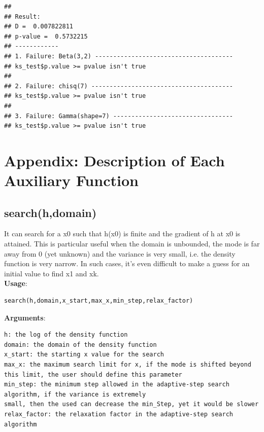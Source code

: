 \documentclass{llncs}\usepackage[]{graphicx}\usepackage[]{color}
\makeatletter
\newenvironment{kframe}{%
 \def\at@end@of@kframe{}%
 \ifinner\ifhmode%
  \def\at@end@of@kframe{\end{minipage}}%
  \begin{minipage}{\columnwidth}%
 \fi\fi%
 \def\FrameCommand##1{\hskip\@totalleftmargin \hskip-\fboxsep
 \colorbox{shadecolor}{##1}\hskip-\fboxsep
     \hskip-\linewidth \hskip-\@totalleftmargin \hskip\columnwidth}%
 \MakeFramed {\advance\hsize-\width
   \@totalleftmargin\z@ \linewidth\hsize
   \@setminipage}}%
 {\par\unskip\endMakeFramed%
 \at@end@of@kframe}
\newenvironment{knitrout}{}{} %
\makeatother
\begin{document}
\begin{knitrout}
\begin{kframe}\begin{lstlisting}[basicstyle=\ttfamily,breaklines=true]
## 
## Result:
## D =  0.007822811 
## p-value =  0.5732215 
## ------------
## 1. Failure: Beta(3,2) --------------------------------------
## ks_test$p.value >= pvalue isn't true
## 
## 2. Failure: chisq(7) ---------------------------------------
## ks_test$p.value >= pvalue isn't true
## 
## 3. Failure: Gamma(shape=7) ---------------------------------
## ks_test$p.value >= pvalue isn't true
\end{lstlisting}
\end{kframe}
\end{knitrout}
\section{Appendix: Description of Each Auxiliary Function}

\subsection{search(h,domain)}
It can search for a x0 such that h(x0) is finite and the gradient of h at x0 is attained. This is particular useful when the domain is unbounded, the mode is far away from 0 (yet unknown) and the variance is very small, i.e. the density function is very narrow. In such cases, it's even difficult to make a guess for an initial value to find x1 and xk.\\
\textbf{Usage}:\\
\begin{verbatim}
search(h,domain,x_start,max_x,min_step,relax_factor)
\end{verbatim}
\textbf{Arguments}:\\
\begin{verbatim}
h: the log of the density function
domain: the domain of the density function
x_start: the starting x value for the search
max_x: the maximum search limit for x, if the mode is shifted beyond this limit, the user should define this parameter
min_step: the minimum step allowed in the adaptive-step search algorithm, if the variance is extremely
small, then the used can decrease the min_Step, yet it would be slower
relax_factor: the relaxation factor in the adaptive-step search algorithm
\end{verbatim}
\end{document}
